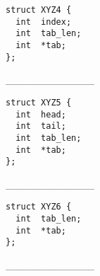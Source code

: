 \documentclass[11pt,a4paper]{article}
\begin{document}
\begin{center}

\begin{table}[ht!]
  \centering
  \begin{minipage}{0.30\textwidth}
    \centering

\lstset{language=C}
\begin{lstlisting}[frame=single]
struct XYZ4 {
  int  index;
  int  tab_len;
  int  *tab;
};
\end{lstlisting}

\_\_\_\_\_\_\_\_\_\_\_\_

  \end{minipage}
  \hfillx
  \begin{minipage}{0.30\textwidth}
    \centering

\lstset{language=C}
\begin{lstlisting}[frame=single]
struct XYZ5 {
  int  head;
  int  tail;
  int  tab_len;
  int  *tab;
};
\end{lstlisting}

\_\_\_\_\_\_\_\_\_\_\_\_

  \end{minipage}
  \hfillx
  \begin{minipage}{0.30\textwidth}
    \centering

\lstset{language=C}
\begin{lstlisting}[frame=single]
struct XYZ6 {
  int  tab_len;
  int  *tab;
};
\end{lstlisting}

\_\_\_\_\_\_\_\_\_\_\_\_

  \end{minipage}
\end{table}

\end{center}

\bigskip

\clearpage



\end{document}
